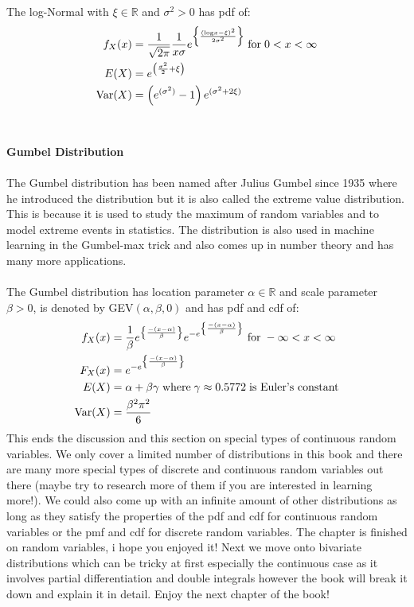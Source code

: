 \documentclass[,oneside]{article}
\begin{document}
\begin{enumerate}
The log-Normal with $\xi \in \mathbb{R}$ and $\sigma^2 > 0$ has pdf of:
\begin{align*}
f_X(x) &= \frac{1}{\sqrt{2\pi}} \frac{1}{x\sigma}e^{\left \{ \frac{(\text{log}x - \xi)^2}{2\sigma^2}\right \} }\hspace{0.1cm} \text{for} \hspace{0.1cm} 0 < x < \infty \\
E(X)&= e^{\left ( \frac{\sigma^2}{2} + \xi \right )}\\
\text{Var}(X)&= \left ( e^{(\sigma^2) }-1 \right ) e^{(\sigma^2+2\xi)}
\end{align*}\\ \\
\textbf{Gumbel Distribution}\\ \\
The Gumbel distribution has been named after Julius Gumbel since 1935 where he introduced the distribution but it is also called the extreme value distribution. This is because it is used to study the maximum of random variables and to model extreme events in statistics. The distribution is also used in machine learning in the Gumbel-max trick and also comes up in number theory and has many more applications.\\ \\
The Gumbel distribution has location parameter $\alpha \in \mathbb{R}$ and scale parameter $\beta > 0$, is denoted by GEV$(\alpha, \beta, 0)$ and has pdf and cdf of:
\begin{align*}
f_X(x)&= \frac{1}{\beta} e^{\left \{ \frac{-(x-\alpha)}{\beta} \right \} } e^{-e^{\left \{ \frac{-(x-\alpha)}{\beta} \right \} }} \hspace{0.1cm} \text{for} \hspace{0.1cm} -\infty < x < \infty \\
F_X(x)&= e^{-e^{\left \{ \frac{-(x-\alpha)}{\beta} \right \} }} \\
E(X)&= \alpha + \beta \gamma \hspace{0.1cm} \text{where} \hspace{0.1cm} \gamma \approx 0.5772 \hspace{0.1cm} \text{is Euler's constant}\\
\text{Var}(X)&= \frac{\beta^2 \pi^2}{6}
\end{align*}
This ends the discussion and this section on special types of continuous random variables. We only cover a limited number of distributions in this book and there are many more special types of discrete and continuous random variables out there (maybe try to research more of them if you are interested in learning more!). We could also come up with an infinite amount of other distributions as long as they satisfy the properties of the pdf and cdf for continuous random variables or the pmf and cdf for discrete random variables. The chapter is finished on random variables, i hope you enjoyed it! Next we move onto bivariate distributions which can be tricky at first especially the continuous case as it involves partial differentiation and double integrals however the book will break it down and explain it in detail. Enjoy the next chapter of the book!
\pagebreak

\end{enumerate}
\end{document}
